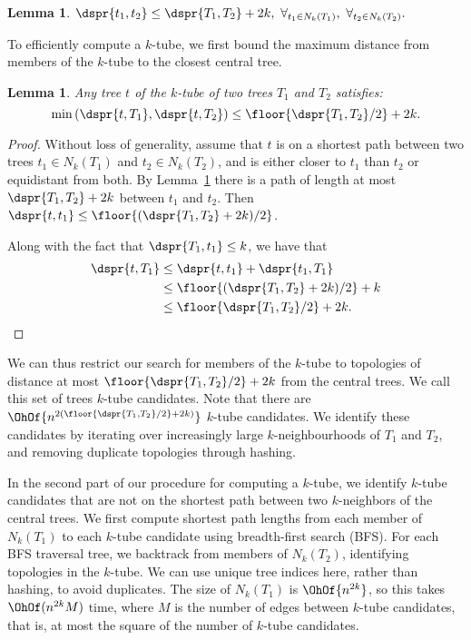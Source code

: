 \documentclass{amsart}
\newtheorem{lemma}[theorem]{Lemma}
\begin{document}
\begin{lemma}
	\label{lem:neighbor_distance}
	$\dspr{t_1, t_2} \le \dspr{T_1, T_2} + 2k,\ \forall_{t_1 \in N_k(T_1)},\ \forall_{t_2 \in N_k(T_2)}.$
\end{lemma}

To efficiently compute a $k$-tube, we first bound the maximum distance from members of the $k$-tube to the closest central tree.
\begin{lemma}
	\label{lem:k_tube_distance}
	Any tree $t$ of the $k$-tube of two trees $T_1$ and $T_2$ satisfies:
	\[ \min\left({\dspr{t, T_1}, \dspr{t, T_2}}\right) \le \floor{\dspr{T_1, T_2}/2} + 2k .\]
\end{lemma}
\begin{proof}
Without loss of generality, assume that $t$ is on a shortest path between two trees $t_1 \in N_k(T_1)$ and $t_2 \in N_k(T_2)$, and is either closer to $t_1$ than $t_2$ or equidistant from both.
By Lemma~\ref{lem:neighbor_distance} there is a path of length at most $\dspr{T_1, T_2} + 2k$ between $t_1$ and $t_2$.
Then $\dspr{t, t_1} \le \floor{(\dspr{T_1, T_2} + 2k) / 2}$.

Along with the fact that $\dspr{T_1, t_1} \le k$, we have that
\begin{align*}
\dspr{t, T_1} &\le \dspr{t, t_1} + \dspr{t_1, T_1} \\
&\le \floor{(\dspr{T_1, T_2} + 2k) / 2} + k \\
&\le \floor{\dspr{T_1, T_2} / 2} + 2k.
\end{align*}

\end{proof}
We can thus restrict our search for members of the $k$-tube to topologies of distance at most $\floor{\dspr{T_1, T_2}/2} + 2k$ from the central trees.
We call this set of trees $k$-tube candidates.
Note that there are $\OhOf{n^{2(\floor{\dspr{T_1, T_2}/2} + 2k)}}$ $k$-tube candidates.
We identify these candidates by iterating over increasingly large $k$-neighbourhoods of $T_1$ and $T_2$, and removing duplicate topologies through hashing.  

In the second part of our procedure for computing a $k$-tube, we identify $k$-tube candidates that are not on the shortest path between two $k$-neighbors of the central trees.
We first compute shortest path lengths from each member of $N_k(T_1)$ to each $k$-tube candidate using breadth-first search (BFS).
For each BFS traversal tree, we backtrack from members of $N_k(T_2)$, identifying topologies in the $k$-tube.
We can use unique tree indices here, rather than hashing, to avoid duplicates.
The size of $N_k(T_1)$ is $\OhOf{n^{2k}}$, so this takes
$\OhOf( n^{2k} M)$ time, where $M$ is the number of edges between $k$-tube candidates, that is, at most the square of the number of $k$-tube candidates. 
\end{document}
